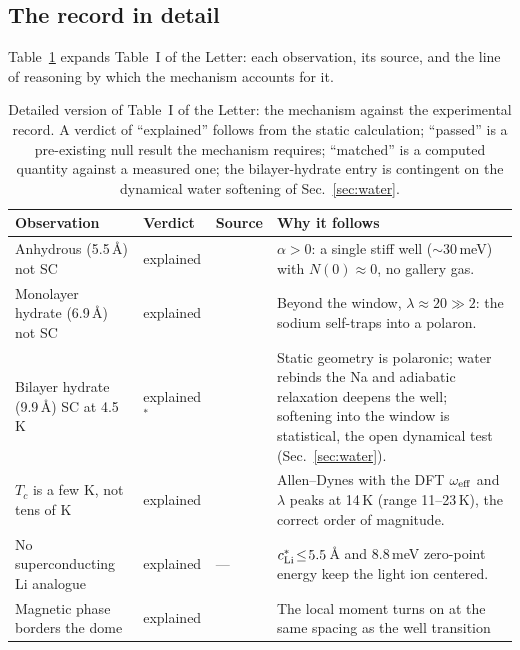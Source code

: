 \documentclass[aps,10pt,preprint,superscriptaddress,floatfix]{revtex4-2}
\begin{document}
\subsection{The record in detail}

Table~\ref{tab:record} expands Table~I of the Letter: each observation, its source, and the line
of reasoning by which the mechanism accounts for it.

\begin{table}[t]
  \caption{Detailed version of Table~I of the Letter: the mechanism against the experimental
  record. A verdict of ``explained'' follows from the static calculation; ``passed'' is a
  pre-existing null result the mechanism requires; ``matched'' is a computed quantity against a
  measured one; the bilayer-hydrate entry is contingent on the dynamical water softening of
  Sec.~\ref{sec:water}.}
  \label{tab:record}
  \scriptsize
  \renewcommand{\arraystretch}{1.02}%
  \begin{tabular}{@{}p{4.7cm}p{1.4cm}p{1.9cm}p{7.3cm}@{}}
    \toprule
    \textbf{Observation} & \textbf{Verdict} & \textbf{Source} & \textbf{Why it follows}\\
    \midrule
    Anhydrous (5.5\,\AA) not SC & explained & \cite{Foo2003} &
      $\alpha>0$: a single stiff well ($\sim30$\,meV) with $N(0)\!\approx\!0$, no gallery gas.\\
    Monolayer hydrate (6.9\,\AA) not SC & explained & \cite{Foo2003} &
      Beyond the window, $\lambda\!\approx\!20\!\gg\!2$: the sodium self-traps into a polaron.\\
    Bilayer hydrate (9.9\,\AA) SC at 4.5\,K & explained$^{\ast}$ & \cite{Takada2003} &
      Static geometry is polaronic; water rebinds the Na and adiabatic relaxation deepens the
      well; softening into the window is statistical, the open dynamical test
      (Sec.~\ref{sec:water}).\\
    $T_c$ is a few K, not tens of K & explained & \cite{Takada2003} &
      Allen--Dynes with the DFT $\omega_{\rm eff}$ and $\lambda$ peaks at 14\,K (range
      11--23\,K), the correct order of magnitude.\\
    No superconducting Li analogue & explained & --- &
      $c^\ast_{\rm Li}\!\le\!5.5$\,\AA{} and 8.8\,meV zero-point energy keep the light ion centered.\\
    Magnetic phase borders the dome & explained & \cite{Sakurai2015} &
      The local moment turns on at the same spacing as the well transition

\end{tabular}
\end{table}
\end{document}
